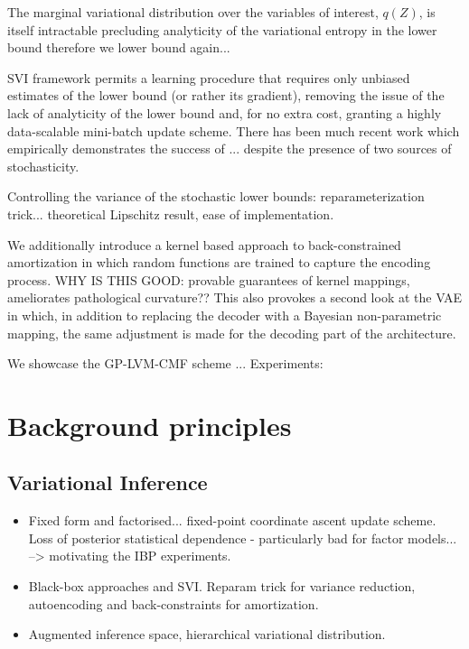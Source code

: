 \documentclass[]{article}
\begin{document}
The marginal variational distribution over the variables of interest, $q(Z)$, is itself intractable precluding analyticity of the variational entropy in the lower bound therefore we lower bound again...

SVI framework permits a learning procedure that requires only unbiased estimates of the lower bound (or rather its gradient), removing the issue of the lack of analyticity of the lower bound and, for no extra cost, granting a highly data-scalable mini-batch update scheme.
There has been much recent work which empirically demonstrates the success of ... despite the presence of two sources of stochasticity.

Controlling the variance of the stochastic lower bounds: reparameterization trick... theoretical Lipschitz result, ease of implementation.


We additionally introduce a kernel based approach to back-constrained amortization in which random functions are trained to capture the encoding process.
WHY IS THIS GOOD: provable guarantees of kernel mappings, ameliorates pathological curvature??
This also provokes a second look at the VAE in which, in addition to replacing the decoder with a Bayesian non-parametric mapping, the same adjustment is made for the decoding part of the architecture.

We showcase the GP-LVM-CMF scheme ...
Experiments:

\section{Background principles}\label{sec:background}

\subsection{Variational Inference}\label{subsec:vi}

\begin{itemize}
  \item Fixed form and factorised... fixed-point coordinate ascent update scheme. Loss of posterior statistical dependence - particularly bad for factor models... --> motivating the IBP experiments.
  \item Black-box approaches and SVI. Reparam trick for variance reduction, autoencoding and back-constraints for amortization.
  \item Augmented inference space, hierarchical variational distribution.
\end{itemize}
\end{document}
